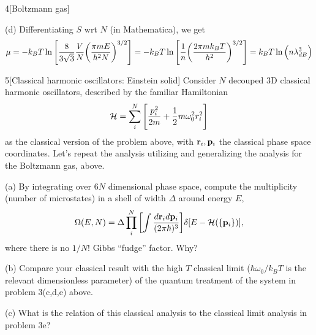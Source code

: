 \documentclass[12pt]{article}
\begin{document}
\begin{problem}{4}[Boltzmann gas]
\begin{solution}
(d) Differentiating $S$ wrt $N$ (in Mathematica), we get
\begin{equation}
    \mu=-k_BT\ln\qty[\frac8{3\sqrt3}\frac{V}{N}\qty(\frac{\pi mE}{h^2N})^{3/2}]
    =-k_BT\ln\qty[\frac{1}{n}\qty(\frac{2\pi mk_BT}{h^2})^{3/2}]
    =k_BT\ln\qty(n\lambda_{dB}^3)
\end{equation}

\end{solution}
\end{problem}
\newpage
\begin{problem}{5}[Classical harmonic oscillators: Einstein solid]
Consider $N$ decouped 3D classical harmonic oscillators, described by the
familiar Hamiltonian
\begin{equation}
    \mathcal{H}=\sum_i^N\qty[\frac{p_i^2}{2m}+\frac12m\omega_0^2r_i^2] 
\end{equation}
as the classical version of the problem above, with $\vb{r}_i,\vb{p}_i$ the
classical phase space coordinates. Let's repeat the analysis utilizing and
generalizing the analysis for the Boltzmann gas, above.

(a) By integrating over $6N$ dimensional phase space, compute the multiplicity
(number of microstates) in a shell of width $\Delta$ around energy $E$,
\begin{equation}
    \Omega(E,N)=\Delta\prod_i^N\qty[\int\frac{d\vb{r}_id\vb{p}_i}{(2\pi\hbar)^3}]\delta[E-\mathcal{H}(\qty{\vb{p}_i})],
\end{equation}
where there is no $1/N!$ Gibbs ``fudge'' factor. Why?

(b) Compare your classical result with the high $T$ classical limit
($\hbar\omega_0/k_BT$ is the relevant dimensionless parameter) of the quantum
treatment of the system in problem 3(c,d,e) above.

(c) What is the relation of this classical analysis to the classical limit
analysis in problem 3e?
\begin{solution}


\end{solution}
\end{problem}
\end{document}
